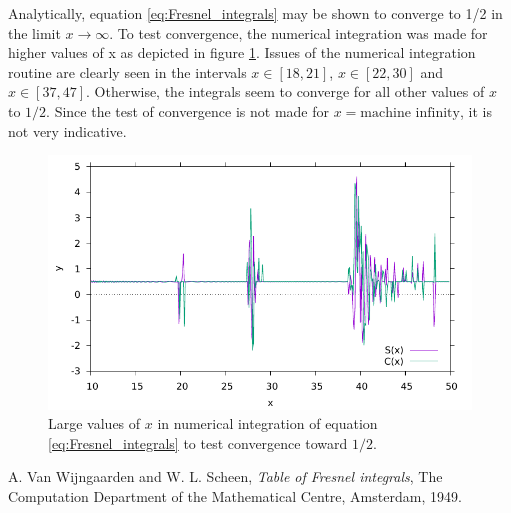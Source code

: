 \documentclass{article}
\begin{document}
	Analytically, equation \ref{eq:Fresnel_integrals} may be shown to converge to 1/2 in the limit $x\rightarrow\infty$. To test convergence, the numerical integration was made for higher values of x as depicted in figure \ref{fig:convergence}. Issues of the numerical integration routine are clearly seen in the intervals $x\in[18,21]$, $x\in[22,30]$ and $x\in[37,47]$. Otherwise, the integrals seem to converge for all other values of $x$ to $1/2$. Since the test of convergence is not made for $x = \textrm{machine infinity}$, it is not very indicative.
	\begin{figure}
	\includegraphics[]{Output2.pdf}
	\caption{Large values of $x$ in numerical integration of equation \ref{eq:Fresnel_integrals} to test convergence toward $1/2$.}
	\label{fig:convergence}
	\end{figure}	

\begin{thebibliography}{9}
	A. Van Wijngaarden and W. L. Scheen,
	\textit{Table of Fresnel integrals},
	The Computation Department of the Mathematical Centre, Amsterdam,
	1949.
\end{thebibliography}
\end{document}
